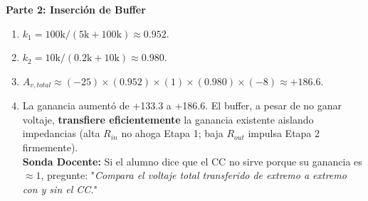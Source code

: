 \documentclass[11pt, a4paper]{article}
\begin{document}
\textbf{Parte 2: Inserción de Buffer}
\begin{enumerate}
    \item $k_1 = 100\text{k} / (5\text{k} + 100\text{k}) \approx 0.952$.
    \item $k_2 = 10\text{k} / (0.2\text{k} + 10\text{k}) \approx 0.980$.
    \item $A_{v,total} \approx (-25) \times (0.952) \times (1) \times (0.980) \times (-8) \approx +186.6$.
    \item La ganancia aumentó de +133.3 a +186.6. El buffer, a pesar de no ganar voltaje, \textbf{transfiere eficientemente} la ganancia existente aislando impedancias (alta $R_{in}$ no ahoga Etapa 1; baja $R_{out}$ impulsa Etapa 2 firmemente). \\
    \textbf{Sonda Docente:} Si el alumno dice que el CC no sirve porque su ganancia es $\approx 1$, pregunte: "\textit{Compara el voltaje total transferido de extremo a extremo con y sin el CC.}"
\end{enumerate}
\end{document}
